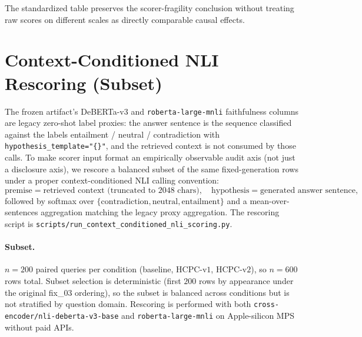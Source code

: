 \documentclass[11pt]{article}
\begin{document}
The standardized table preserves the scorer-fragility conclusion
without treating raw scores on different scales as directly comparable
causal effects.

\section{Context-Conditioned NLI Rescoring (Subset)}
\label{supp:context_conditioned_nli}

The frozen artifact's DeBERTa-v$3$ and \texttt{roberta-large-mnli}
faithfulness columns are legacy zero-shot label proxies: the answer
sentence is the sequence classified against the labels
entailment / neutral / contradiction with
\texttt{hypothesis\_template="\{\}"}, and the retrieved context is
not consumed by those calls. To make scorer input format an
empirically observable audit axis (not just a disclosure axis), we
rescore a balanced subset of the same fixed-generation rows under a
proper context-conditioned NLI calling convention:
\[
\text{premise} = \text{retrieved context (truncated to 2048 chars)},
\quad
\text{hypothesis} = \text{generated answer sentence},
\]
followed by softmax over
$\{\text{contradiction},\text{neutral},\text{entailment}\}$ and a
mean-over-sentences aggregation matching the legacy proxy aggregation.
The rescoring script is \texttt{scripts/run\_context\_conditioned\_nli\_scoring.py}.

\paragraph{Subset.} $n=200$ paired queries per condition (baseline,
HCPC-v$1$, HCPC-v$2$), so $n=600$ rows total. Subset selection is
deterministic (first $200$ rows by appearance under the original
fix\_03 ordering), so the subset is balanced across conditions but is
not stratified by question domain. Rescoring is performed with both
\texttt{cross-encoder/nli-deberta-v3-base} and
\texttt{roberta-large-mnli} on Apple-silicon MPS without paid APIs.
\end{document}
